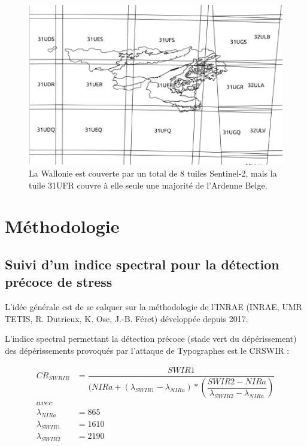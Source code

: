 \documentclass[a4paper, 12pt]{article} %
\begin{document}
\begin{figure}[H]
\centering
\includegraphics[width=0.9\linewidth]{../theia_d/tuileS2Nom.png}
\caption{La Wallonie est couverte par un total de 8 tuiles Sentinel-2, mais la tuile 31UFR couvre à elle seule une majorité de l'Ardenne Belge.}
\label{fig:tuileRW}
\end{figure}

\section{Méthodologie}

\subsection{Suivi d'un indice spectral pour la détection précoce de stress}\label{subsec:methodo}


L'idée générale est de se calquer sur la méthodologie de l'INRAE (INRAE, UMR TETIS, R. Dutrieux, K. Ose, J.-B. Féret) développée depuis 2017. 

L'indice spectral permettant la détection précoce (stade vert du dépérissement) des dépérissements provoqués par l'attaque de Typographes est le CRSWIR :

\begin{align*} 
CR_{SWRIR} &= \dfrac{SWIR1}{( NIRa + (\lambda_{SWIR1}-\lambda_{NIRa})* (\dfrac{SWIR2 - NIRa}{\lambda_{SWIR2}-\lambda_{NIRa}})} \\ 
avec&\\ 
\lambda_{NIRa} &=865\\ 
\lambda_{SWIR1} &=1610\\ 
\lambda_{SWIR2} &=2190
\end{align*} 
\end{document}
